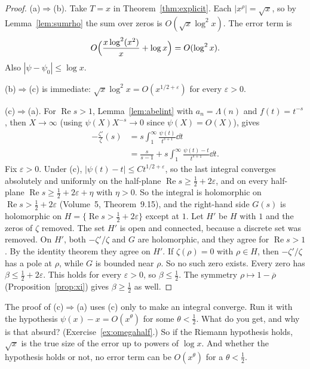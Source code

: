 \begin{proof}
(a)$\Rightarrow$(b). Take $T=x$ in Theorem~\ref{thm:explicit}. Each $|x^\rho|=\sqrt x$, so by Lemma~\ref{lem:sumrho} the sum over zeros is $O(\sqrt x\log^2x)$. The error term is
\[
O\Bigl(\frac{x\log^2(x^2)}x+\log x\Bigr)=O(\log^2x).
\]
Also $|\psi-\psi_0|\le\log x$.

(b)$\Rightarrow$(c) is immediate: $\sqrt x\log^2x=O(x^{1/2+\varepsilon})$ for every $\varepsilon>0$.

(c)$\Rightarrow$(a). For $\operatorname{Re}s>1$, Lemma~\ref{lem:abelint} with $a_n=\Lambda(n)$ and $f(t)=t^{-s}$, then $X\to\infty$ (using $\psi(X)X^{-s}\to0$ since $\psi(X)=O(X)$), gives
\[
\begin{aligned}-\frac{\zeta'}\zeta(s)&=s\int_1^\infty\frac{\psi(t)}{t^{s+1}}\dd t\\&=\frac s{s-1}+s\int_1^\infty\frac{\psi(t)-t}{t^{s+1}}\dd t.\end{aligned}
\]
Fix $\varepsilon>0$. Under (c), $|\psi(t)-t|\le Ct^{1/2+\varepsilon}$, so the last integral converges absolutely and uniformly on the half-plane $\operatorname{Re}s\ge\frac12+2\varepsilon$, and on every half-plane $\operatorname{Re}s\ge\frac12+2\varepsilon+\eta$ with $\eta>0$. So the integral is holomorphic on $\operatorname{Re}s>\frac12+2\varepsilon$ (Volume~5, Theorem~9.15), and the right-hand side $G(s)$ is holomorphic on $H=\{\operatorname{Re}s>\frac12+2\varepsilon\}$ except at $1$. Let $H'$ be $H$ with $1$ and the zeros of $\zeta$ removed. The set $H'$ is open and connected, because a discrete set was removed. On $H'$, both $-\zeta'/\zeta$ and $G$ are holomorphic, and they agree for $\operatorname{Re}s>1$. By the identity theorem they agree on $H'$. If $\zeta(\rho)=0$ with $\rho\in H$, then $-\zeta'/\zeta$ has a pole at $\rho$, while $G$ is bounded near $\rho$. So no such zero exists. Every zero has $\beta\le\frac12+2\varepsilon$. This holds for every $\varepsilon>0$, so $\beta\le\frac12$. The symmetry $\rho\mapsto1-\overline\rho$ (Proposition~\ref{prop:xi}) gives $\beta\ge\frac12$ as well.
\end{proof}

\begin{think}
The proof of (c)$\Rightarrow$(a) uses (c) only to make an integral converge. Run it with the hypothesis $\psi(x)-x=O(x^\theta)$ for some $\theta<\frac12$. What do you get, and why is that absurd? (Exercise~\ref{ex:omegahalf}.) So if the Riemann hypothesis holds, $\sqrt x$ is the true size of the error up to powers of $\log x$. And whether the hypothesis holds or not, no error term can be $O(x^\theta)$ for a $\theta<\frac12$.
\end{think}

